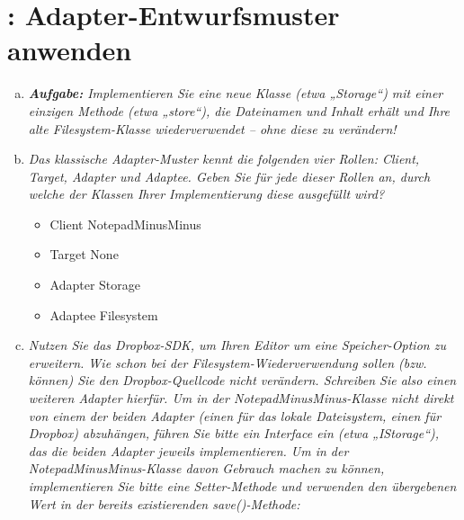 \section{: Adapter-Entwurfsmuster anwenden}
\begin{enumerate}[(a)]
    \item {\itshape \textbf{Aufgabe:} Implementieren Sie eine neue Klasse (etwa „Storage“) mit einer einzigen Methode (etwa „store“), die Dateinamen und Inhalt erhält und Ihre alte Filesystem-Klasse wiederverwendet – ohne diese zu verändern!}
    \begin{itemize}
        
        
    \end{itemize}
  
    \item {\itshape Das klassische Adapter-Muster kennt die folgenden vier Rollen: Client, Target, Adapter und Adaptee. Geben Sie für jede dieser Rollen an, durch welche der Klassen Ihrer Implementierung diese ausgefüllt wird?}
    \begin{itemize}
        \item Client \rightarrow NotepadMinusMinus
        \item Target \rightarrow None
        \item Adapter \rightarrow Storage
        \item Adaptee \rightarrow Filesystem
    \end{itemize}
   

    \item {\itshape Nutzen Sie das Dropbox-SDK, um Ihren Editor um eine Speicher-Option zu erweitern. Wie schon bei der Filesystem-Wiederverwendung sollen (bzw. können) Sie den Dropbox-Quellcode nicht verändern. Schreiben Sie also einen weiteren Adapter hierfür. Um in der NotepadMinusMinus-Klasse nicht direkt von einem der beiden Adapter (einen für das lokale Dateisystem, einen für Dropbox) abzuhängen, führen Sie bitte ein Interface ein (etwa „IStorage“), das die beiden Adapter jeweils implementieren. Um in der NotepadMinusMinus-Klasse davon Gebrauch machen zu können, implementieren Sie bitte eine Setter-Methode und verwenden den übergebenen Wert in der bereits existierenden save()-Methode:}
    \newpage
    \begin{itemize}
        
        
        
        
    \end{itemize}
   

\end{enumerate}
